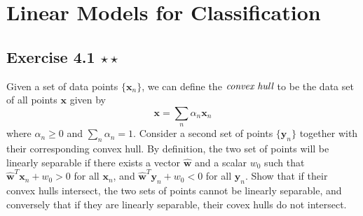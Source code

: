 \chapter{Linear Models for Classification}

\section*{Exercise 4.1 $\star \star$}
Given a set of data points $\{\mathbf{x}_n\}$, we can define the
$\emph{convex hull}$ to be the data set of all points 
$\mathbf{x}$ given by
\begin{equation}\label{eq:4.156}\tag{4.156}
    \mathbf{x} = \sum_{n} \alpha_n \mathbf{x}_n
\end{equation}
where $\alpha_n \geq 0$ and $\sum_{n} \alpha_n = 1$. Consider
a second set of points $\{\mathbf{y}_n\}$ together with
their corresponding convex hull. By definition,
the two set of points will be linearly separable
if there exists a vector $\widehat{\mathbf{w}}$ and
a scalar $w_0$ such that $\widehat{\mathbf{w}}^T\mathbf{x}_n + w_0 > 0$
for all $\mathbf{x}_n$, and $\widehat{\mathbf{w}}^T\mathbf{y}_n + w_0 < 0$
for all $\mathbf{y}_n$. Show that if their convex hulls intersect,
the two sets of points cannot be linearly separable, and conversely
that if they are linearly separable, their covex hulls do not intersect.

\vspace{1em}

